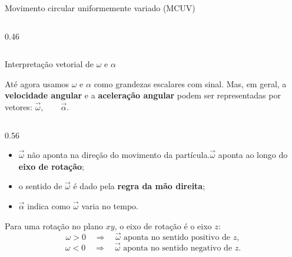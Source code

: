 \documentclass{beamer}
\begin{document}
\begin{frame}{Movimento circular uniformemente variado (MCUV)}
\begin{columns}[T,onlytextwidth]
\begin{column}{0.46\textwidth}
			\end{column}
		\end{columns}
		
	\end{frame}
	
	
	\begin{frame}{Interpretação vetorial de \(\omega\) e \(\alpha\)}
		\scriptsize
		
		Até agora usamos \(\omega\) e \(\alpha\) como grandezas escalares com sinal.
		Mas, em geral, a \textbf{velocidade angular} e a \textbf{aceleração angular}
		podem ser representadas por vetores:
		$
		\vec\omega, \qquad \vec\alpha.
		$
		
		\begin{columns}[T,onlytextwidth]
			
			\begin{column}{0.56\textwidth}
				
				\begin{itemize}
					\item \(\vec\omega\) não aponta na direção do movimento da partícula.\(\vec\omega\) aponta ao longo do \textbf{eixo de rotação};
					\item o sentido de \(\vec\omega\) é dado pela \textbf{regra da mão direita};
					\item \(\vec\alpha\) indica como \(\vec\omega\) varia no tempo.
				\end{itemize}
				
				\vspace{0.1cm}
				
				Para uma rotação no plano \(xy\), o eixo de rotação é o eixo \(z\):
				\[
				\omega>0
				\quad \Rightarrow \quad
				\vec\omega \text{ aponta no sentido positivo de } z,
				\]
				\[
				\omega<0
				\quad \Rightarrow \quad
				\vec\omega \text{ aponta no sentido negativo de } z.
				\]
				
				\vspace{0.1cm}
				

\end{column}
\end{columns}
\end{frame}
\end{document}
